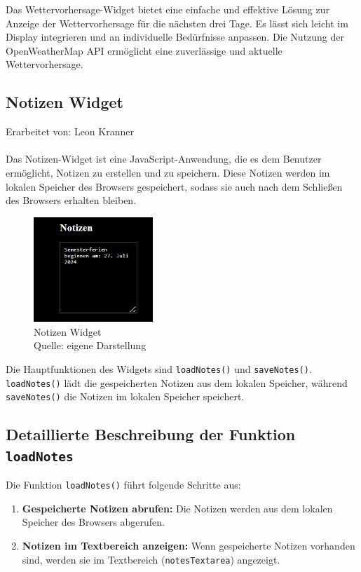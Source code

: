 \noindent
Das Wettervorhersage-Widget bietet eine einfache und effektive Lösung zur Anzeige der Wettervorhersage für die nächsten drei Tage. Es lässt sich leicht im Display integrieren und an individuelle Bedürfnisse anpassen. Die Nutzung der OpenWeatherMap API ermöglicht eine zuverlässige und aktuelle Wettervorhersage.


\subsection{Notizen Widget}
Erarbeitet von: Leon Kranner \\ \\

\noindent
Das Notizen-Widget ist eine JavaScript-Anwendung, die es dem Benutzer ermöglicht, Notizen zu erstellen und zu speichern. Diese Notizen werden im lokalen Speicher des Browsers gespeichert, sodass sie auch nach dem Schließen des Browsers erhalten bleiben.

\begin{figure}[h]
    \centering
    \includegraphics[width=0.4\textwidth]{pictures/notes_widget.png}
  \captionsetup{justification=centering, labelformat=simple, singlelinecheck=false}
    \caption[Notizen Widget]{Notizen Widget\\ Quelle: eigene Darstellung}
\end{figure}

\noindent
Die Hauptfunktionen des Widgets sind \texttt{loadNotes()} und \texttt{saveNotes()}. \texttt{loadNotes()} lädt die gespeicherten Notizen aus dem lokalen Speicher, während \texttt{saveNotes()} die Notizen im lokalen Speicher speichert.

\subsection*{Detaillierte Beschreibung der Funktion \texttt{loadNotes}}
Die Funktion \texttt{loadNotes()} führt folgende Schritte aus:

\begin{enumerate}
    \item \textbf{Gespeicherte Notizen abrufen:}
    Die Notizen werden aus dem lokalen Speicher des Browsers abgerufen.
    
    \item \textbf{Notizen im Textbereich anzeigen:}
    Wenn gespeicherte Notizen vorhanden sind, werden sie im Textbereich (\texttt{notesTextarea}) angezeigt.
\end{enumerate}

